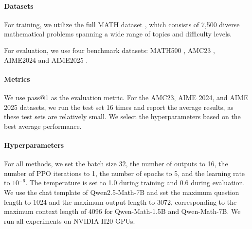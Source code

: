 \documentclass{article}
\theoremstyle{plain}
\theoremstyle{definition}
\theoremstyle{remark}
\begin{document}
\paragraph{Datasets}
For training, we utilize the full MATH dataset \citep{hendrycks2021measuring}, which consists of 7,500 diverse mathematical problems spanning a wide range of topics and difficulty levels.

For evaluation, we use four benchmark datasets: MATH500 \citep{hendrycks2021measuring,lightman2023let}, AMC23 \citep{aops_amc}, AIME2024 and AIME2025 \citep{aops_aime}. %

\paragraph{Metrics}
We use pass@1 as the evaluation metric. For the AMC23, AIME 2024, and AIME 2025 datasets, we run the test set 16 times and report the average results, as these test sets are relatively small. We select the hyperparameters based on the best average performance.

\paragraph{Hyperparameters}
For all methods, we set the batch size 32, the number of outputs to 16, the number of PPO iterations to 1, the number of epochs to 5, and the learning rate to $10^{-6}$. The temperature is set to 1.0 during training and 0.6 during evaluation. We use the chat template of Qwen2.5-Math-7B and set the maximum question length to 1024 and the maximum output length to 3072, corresponding to the maximum context length of 4096 for Qwen-Math-1.5B and Qwen-Math-7B. We run all experiments on NVIDIA H20 GPUs.
\end{document}
